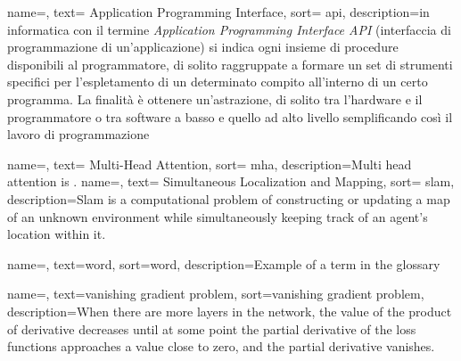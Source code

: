 \renewcommand{\acronymname}{Acronimi e abbreviazioni}

{
name=,
text= Application Programming Interface,
sort= api,
description={in informatica con il termine \emph{Application Programming Interface API} (interfaccia di programmazione di un'applicazione) si indica ogni insieme di procedure disponibili al programmatore, di solito raggruppate a formare un set di strumenti specifici per l'espletamento di un determinato compito all'interno di un certo programma.
La finalità è ottenere un'astrazione, di solito tra l'hardware e il programmatore o tra software a basso e quello ad alto livello semplificando così il lavoro di programmazione}
}

{
    name=,
    text= Multi-Head Attention,
    sort= mha,
    description={Multi head attention is .}
}
{
    name=,
    text= Simultaneous Localization and Mapping,
    sort= slam,
    description={Slam is a computational problem of constructing or updating a map of an unknown environment while simultaneously keeping track of an agent's location within it.}
}



{
    name=,
    text=word,
    sort=word,
    description={Example of a term in the glossary}
}

{
    name=,
    text=vanishing gradient problem,
    sort=vanishing gradient problem,
    description={When there are more layers in the network, the value of the product of derivative decreases until at some point the partial derivative of the loss functions approaches a value close to zero, and the partial derivative vanishes.}
}

